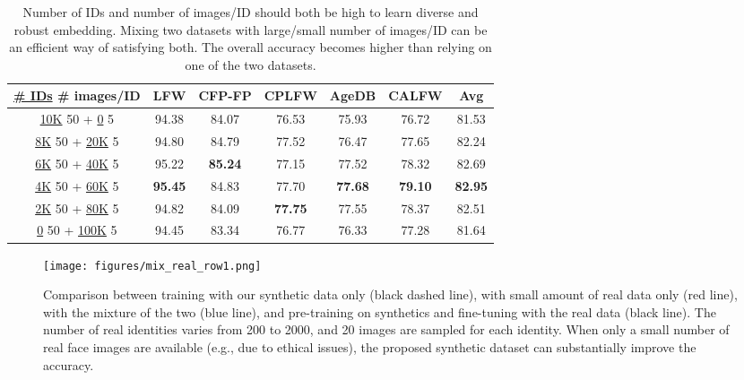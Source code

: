 \documentclass[10pt,twocolumn,letterpaper]{article}
\begin{document}
\begin{table}[t]
\footnotesize
\setlength{\tabcolsep}{2.0pt}
\begin{center}
\begin{tabular}{c|ccccc|c}
\toprule
\underline{\# IDs}  \# images/ID  & LFW & CFP-FP & CPLFW & AgeDB & CALFW & Avg \\
\midrule
\underline{10K}  50 + \underline{0}  5 & 94.38 & 84.07 & 76.53 & 75.93 & 76.72 & 81.53 \\
\underline{8K}  50 + \underline{20K}  5 & 94.80 & 84.79 & 77.52 & 76.47 & 77.65 & 82.24 \\
\underline{6K}  50 + \underline{40K}  5 & 95.22 & \textbf{85.24} & 77.15 & 77.52 & 78.32 & 82.69 \\
\underline{4K}  50 + \underline{60K}  5 & \textbf{95.45} & 84.83 & 77.70 & \textbf{77.68} & \textbf{79.10} & \textbf{82.95} \\
\underline{2K}  50 + \underline{80K}  5 & 94.82 & 84.09 & \textbf{77.75} & 77.55 & 78.37 & 82.51 \\
\underline{0}  50 + \underline{100K}  5 & 94.45 & 83.34 & 76.77 & 76.33 & 77.28 & 81.64 \\
\bottomrule
\end{tabular}
\end{center}
\caption{Number of IDs and number of images/ID should both be high to learn diverse and robust embedding. Mixing two datasets with large/small number of images/ID can be an efficient way of satisfying both. The overall accuracy becomes higher than relying on one of the two datasets.}
\label{table:mix_large_ids}
\end{table}
    
\begin{figure*}[t]
\begin{center}
\texttt{[image: figures/mix\_real\_row1.png]}
\end{center}
\caption{Comparison between training with our synthetic data only (black dashed line), with small amount of real data only (red line), with the mixture of the two (blue line), and pre-training on synthetics and fine-tuning with the real data (black line). The number of real identities varies from 200 to 2000, and 20 images are sampled for each identity.
When only a small number of real face images are available (e.g., due to ethical issues), the proposed synthetic dataset can substantially improve the accuracy.}
\label{fig:mix_real}
\end{figure*}
\end{document}
